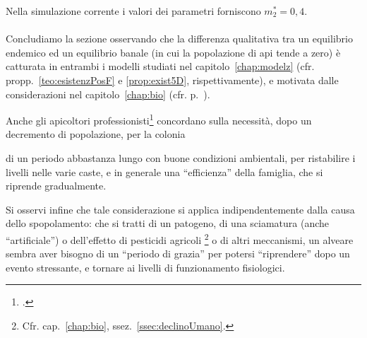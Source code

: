 Nella simulazione corrente i valori dei parametri forniscono $m_2^*=0,4$.


\paragraph{}
Concludiamo la sezione osservando che la differenza qualitativa tra un equilibrio endemico ed un equilibrio banale
(\ie in cui la popolazione di api tende a zero) è catturata in entrambi i modelli studiati nel capitolo~\ref{chap:modelz}
(cfr. propp.~\ref{teo:esistenzPosF} e \ref{prop:exist5D}, rispettivamente), e motivata dalle considerazioni
nel capitolo~\ref{chap:bio} (cfr. p.~\pageref{par:alleeEffect}).

Anche gli apicoltori professionisti\footcite{privFPan,meccanica} concordano sulla necessità, dopo un decremento di
popolazione, per la colonia
\begin{displayquote}
    \omissis di un periodo abbastanza lungo con buone condizioni ambientali, per ristabilire i livelli
    nelle varie caste, e in generale una ``efficienza'' della famiglia, che si riprende gradualmente.
\end{displayquote}

Si osservi infine che tale considerazione si applica indipendentemente dalla causa dello spopolamento: che si tratti
di un patogeno, di una sciamatura (anche ``artificiale'') o dell'effetto di pesticidi agricoli%
\footnote{Cfr. cap.~\ref{chap:bio}, ssez.~\ref{ssec:declinoUmano}.}
o di altri meccanismi, un alveare sembra aver bisogno di un ``periodo di grazia'' per potersi ``riprendere'' dopo un evento
stressante, e tornare ai livelli di funzionamento fisiologici.


